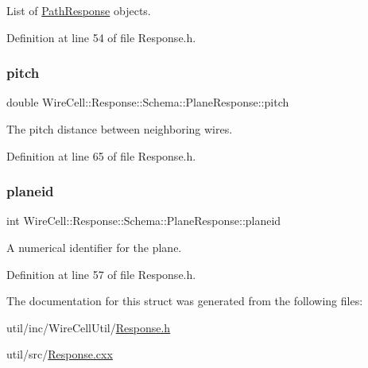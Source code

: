 List of \hyperlink{struct_wire_cell_1_1_response_1_1_schema_1_1_path_response}{Path\+Response} objects. 



Definition at line 54 of file Response.\+h.

\mbox{\label{struct_wire_cell_1_1_response_1_1_schema_1_1_plane_response_a75ace824dc59dc7b45953987c8e5c3b4}} 
\subsubsection{\texorpdfstring{pitch}{pitch}}
{\footnotesize\ttfamily double Wire\+Cell\+::\+Response\+::\+Schema\+::\+Plane\+Response\+::pitch}



The pitch distance between neighboring wires. 



Definition at line 65 of file Response.\+h.

\mbox{\label{struct_wire_cell_1_1_response_1_1_schema_1_1_plane_response_ab039eb6a235ccaad959a333759584801}} 
\subsubsection{\texorpdfstring{planeid}{planeid}}
{\footnotesize\ttfamily int Wire\+Cell\+::\+Response\+::\+Schema\+::\+Plane\+Response\+::planeid}



A numerical identifier for the plane. 



Definition at line 57 of file Response.\+h.



The documentation for this struct was generated from the following files\+:\begin{DoxyCompactItemize}
\item 
util/inc/\+Wire\+Cell\+Util/\hyperlink{_response_8h}{Response.\+h}\item 
util/src/\hyperlink{_response_8cxx}{Response.\+cxx}\end{DoxyCompactItemize}
